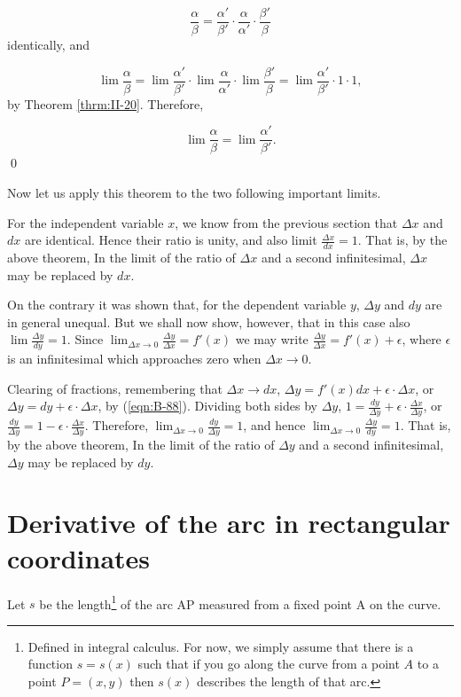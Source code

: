 \[
\frac{\alpha}{\beta} 	
= \frac{\alpha'}{\beta'} \cdot \frac{\alpha}{\alpha'} 
\cdot \frac{\beta'}{\beta}
\]
identically, and 

\[
\lim \frac{\alpha}{\beta} 	
= \lim \frac{\alpha '}{\beta '} \cdot \lim \frac{\alpha}{\alpha '} 
\cdot \lim \frac{\beta '}{\beta}
=\lim \frac{\alpha'}{\beta'} \cdot 1 \cdot 1 ,
\]
by Theorem \ref{thrm:II-20}. %
Therefore, 

\[
\lim \frac{\alpha}{\beta} 	= \lim \frac{\alpha'}{\beta'}.
\]
\qed

Now let us apply this theorem to the two following important limits.

For the independent variable $x$, we know from the previous 
section that $\Delta x$ and $dx$ are identical.
Hence their ratio is unity, and also limit 
$\frac{\Delta x}{dx} = 1$. That is, by the above theorem,
In the limit of the ratio of $\Delta x$ and a second infinitesimal, 
$\Delta x$ may be replaced by $dx$.

On the contrary it was shown that, for the dependent variable $y$, 
$\Delta y$ and $dy$ are in general unequal. But we shall now show, however, 
that in this case also
$\lim \frac{\Delta y}{dy} 	= 1$.
Since $\lim_{\Delta x \to 0} \frac{\Delta y}{\Delta x} = f'(x)$ 
we may write $\frac{\Delta y}{\Delta x} 	= f'(x) + \epsilon$,
where $\epsilon$ is an infinitesimal which approaches 
zero when $\Delta x \to 0$.

Clearing of fractions, remembering that $\Delta x \to dx$,
$\Delta y= f'(x)dx + \epsilon \cdot \Delta x$,
or $\Delta y= dy + \epsilon \cdot \Delta x$, 
by (\ref{eqn:B-88}). %
Dividing both sides by $\Delta y$,
$1 	= \frac{dy}{\Delta y} + \epsilon \cdot \frac{\Delta x}{\Delta y}$,
or $\frac{dy}{\Delta y}	= 1 - \epsilon \cdot \frac{\Delta x}{\Delta y}$.
Therefore, $\lim_{\Delta x \to 0} \frac{dy}{\Delta y} = 1$,
and hence $\lim_{\Delta x \to 0} \frac{\Delta y}{dy} = 1$. 
That is, by the above theorem,
In the limit of the ratio of $\Delta y$ and a second infinitesimal, 
$\Delta y$ may be replaced by $dy$.

\section{Derivative of the arc in rectangular coordinates}
\label{sec:90}

Let $s$ be the length\footnote{Defined in integral calculus. 
For now, we simply assume that there is a function $s=s(x)$
such that if you go along the curve from a point $A$ to a point 
$P=(x,y)$ then $s(x)$ describes the length of that arc.}  %
of the arc AP measured from a fixed point A on the curve.


